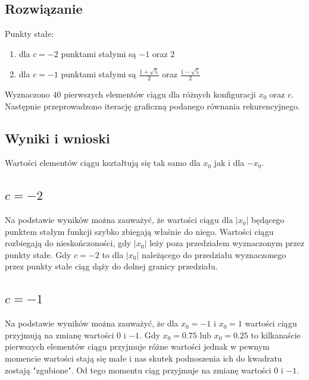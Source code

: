 \documentclass{article}
\begin{document}
\subsection{Rozwiązanie}
Punkty stałe:
\begin{enumerate}
    \item dla $c = -2$ punktami stałymi są $-1$ oraz $2$
    \item dla $c = -1$ punktami stałymi są $\frac{1 + \sqrt{5}}{2}$ oraz $\frac{1 - \sqrt{5}}{2}$
\end{enumerate}
Wyznaczono $40$ pierwszych elementów ciągu dla różnych konfiguracji $x_0$ oraz $c$. Następnie przeprowadzono iterację graficzną podanego równania rekurencyjnego.

\subsection{Wyniki i wnioski}
Wartości elementów ciągu kształtują się tak samo dla $x_0$ jak i dla $-x_0$. 
\subsection{$c = -2$}
Na podstawie wyników można zauważyć, że wartości ciągu dla $|x_0|$ będącego punktem stałym funkcji szybko zbiegają właśnie do niego. Wartości ciągu rozbiegają do nieskończoności, gdy $|x_0|$ leży poza przedziałem wyznaczonym przez punkty stałe. Gdy $c=-2$ to dla $|x_0|$ należącego do przedziału wyznaczonego przez punkty stałe ciąg dąży do dolnej granicy przedziału.

\subsection{$c = -1$}
Na podstawie wyników można zauważyć, że dla $x_0 = -1$ i $x_0 = 1$ wartości ciągu przyjmują na zmianę wartości $0$ i $-1$. Gdy $x_0 = 0.75$ lub $x_0 = 0.25$ to kilkanaście pierwszych elementów ciągu przyjmuje różne wartości jednak w pewnym momencie wartości stają się małe i nas skutek podnoszenia ich do kwadratu zostają "zgubione". Od tego momentu ciąg przyjmuje na zmianę wartości $0$ i $-1$. 
\end{document}

